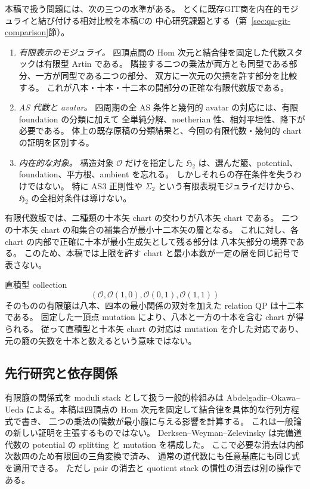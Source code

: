 \documentclass[a4paper,11pt]{ltjsarticle}
\numberwithin{equation}{section}
\theoremstyle{plain}
\theoremstyle{definition}
\theoremstyle{remark}
\newcommand{\OO}{\mathcal O}
\newcommand{\HHstack}{\mathfrak H_2}
\begin{document}
本稿で扱う問題には、次の三つの水準がある。
とくに既存GIT商を内在的モジュライと結び付ける相対比較を本稿Cの
中心研究課題とする（第~\ref{sec:qa-git-comparison}節）。
\begin{enumerate}
\item \emph{有限表示のモジュライ。}
  四頂点間の Hom 次元と結合律を固定した代数スタックは有限型 Artin である。
  隣接する二つの乗法が両方とも同型である部分、一方が同型である二つの部分、
  双方に一次元の欠損を許す部分を比較する。
  これが八本・十本・十二本の開部分の正確な有限代数版である。
\item \emph{AS 代数と avatar。}
  四周期の全 AS 条件と幾何的 avatar の対応には、有限 foundation の分類に加えて
  全単純分解、noetherian 性、相対平坦性、降下が必要である。
  体上の既存原稿の分類結果と、今回の有限代数・幾何的 chart の証明を区別する。
\item \emph{内在的な対象。}
  構造対象 $\OO$ だけを指定した $\HHstack$ は、選んだ箙、potential、
  foundation、平方根、ambient を忘れる。
  しかしそれらの存在条件を失うわけではない。
  特に AS3 正則性や $\Sigma_2$ という有限表現モジュライだけから、
  $\HHstack$ の全相対条件は導けない。
\end{enumerate}

有限代数版では、二種類の十本矢 chart の交わりが八本矢 chart である。
二つの十本矢 chart の和集合の補集合が最小十二本矢の層となる。
これに対し、各 chart の内部で正確に十本が最小生成矢として残る部分は
八本矢部分の境界である。
このため、本稿では上限を許す chart と最小本数が一定の層を同じ記号で表さない。

直積型 collection
\[
 (\OO,\OO(1,0),\OO(0,1),\OO(1,1))
\]
そのものの有限箙は八本、四本の最小関係の双対を加えた relation QP は十二本である。
固定した一頂点 mutation により、八本と一方の十本を含む chart が得られる。
従って直積型と十本矢 chart の対応は mutation を介した対応であり、
元の箙の矢数を十本と数えるという意味ではない。

\subsection{先行研究と依存関係}

有限箙の関係式を moduli stack として扱う一般的枠組みは
Abdelgadir--Okawa--Ueda \cite[Definitions 3.5, 4.1; Propositions 3.6, 4.2]{AOU2014}
による。本稿は四頂点の Hom 次元を固定して結合律を具体的な行列方程式で書き、
二つの乗法の階数が最小箙に与える影響を計算する。
これは一般論の新しい証明を主張するものではない。
Derksen--Weyman--Zelevinsky \cite[Theorem 4.6; Section 5]{DWZ2008}
は完備道代数の potential の splitting と mutation を構成した。
ここで必要な消去は内部次数四のため有限回の三角変換で済み、
通常の道代数にも任意基底にも同じ式を適用できる。
ただし pair の消去と quotient stack の慣性の消去は別の操作である。
\end{document}
